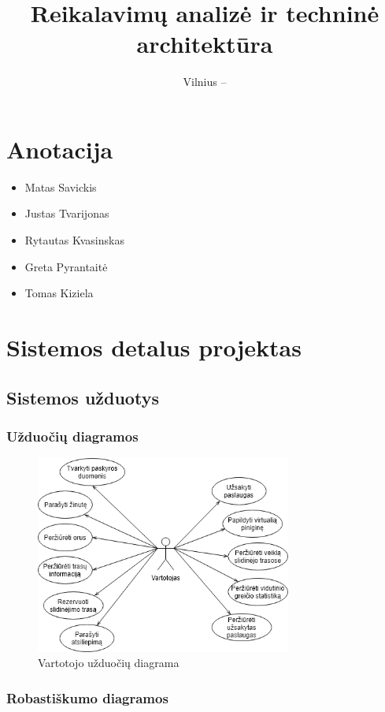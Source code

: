 \documentclass[oneside]{VUMIFPSkursinis}
\title{Reikalavimų analizė ir techninė architektūra}
\date{Vilnius – \the\year}
\begin{document}
\maketitle
\tableofcontents

\section{Anotacija}
\begin{itemize}
	\item{Matas Savickis}
	\item{Justas Tvarijonas}
	\item{Rytautas Kvasinskas}
	\item{Greta Pyrantaitė}
	\item{Tomas Kiziela}
\end{itemize}

\section{Sistemos detalus projektas}
	\subsection{Sistemos užduotys}
		\subsubsection{Užduočių diagramos}


			\begin{figure}[h]
    				\centering
    				\includegraphics[width=0.75\textwidth]{useCaseVartotojas.png}
    				\caption{Vartotojo užduočių diagrama}
    				\label{fig:VartotojoUseCasel}
			\end{figure}
\pagebreak

	\subsubsection{Robastiškumo diagramos}
\end{document}
